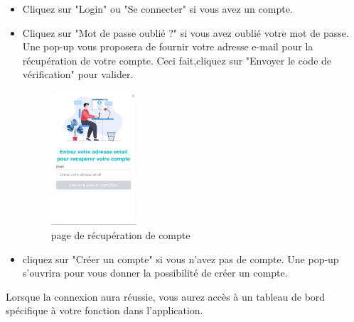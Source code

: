 \documentclass[12pt]{article}
\begin{document}
\bigskip

\begin{itemize}
    \item Cliquez sur "Login" ou "Se connecter" si vous avez un compte. 
    \item Cliquez sur "Mot de passe oublié ?" si vous avez oublié votre mot de passe. Une pop-up vous proposera de fournir votre adresse e-mail pour la récupération de votre compte. Ceci fait,cliquez sur "Envoyer le code de vérification" pour valider. 
        \begin{figure}[h!]
            \centering
            \includegraphics[width=0.3\textwidth]{./images/recup-compte.jpg}
            \caption{page de récupération de compte}
            \label{fig:page de récupération de compte}
        \end{figure}
    \item cliquez sur "Créer un compte" si vous n'avez pas de compte. Une pop-up s'ouvrira pour vous donner la possibilité de créer un compte. 
\end{itemize}
Lorsque la connexion aura réussie, vous aurez accès à un tableau de bord spécifique à votre fonction dans l'application.

\medskip
\end{document}
